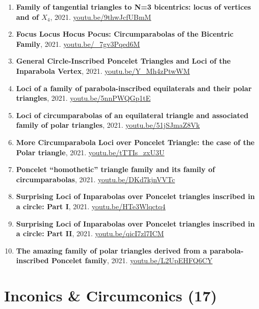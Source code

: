 \documentclass[12pt]{article}
\begin{document}
\begin{enumerate}[resume]
\item \textbf{Family of tangential triangles to N=3 bicentrics: locus of vertices and of $X_{4}$}, 2021. \href{https://youtu.be/9thwJcfUBmM}{\url{youtu.be/9thwJcfUBmM}}
\item \textbf{Focus Locus Hocus Pocus: Circumparabolas of the Bicentric Family}, 2021. \href{https://youtu.be/_7gv3Pqed6M}{\url{youtu.be/\_7gv3Pqed6M}}
\item \textbf{General Circle-Inscribed Poncelet Triangles and Loci of the Inparabola Vertex}, 2021. \href{https://youtu.be/Y_Mh4zPtwWM}{\url{youtu.be/Y\_Mh4zPtwWM}}
\item \textbf{Loci of a family of parabola-inscribed equilaterals and their polar triangles}, 2021. \href{https://youtu.be/5nnPWQGp1tE}{\url{youtu.be/5nnPWQGp1tE}}
\item \textbf{Loci of circumparabolas of an equilateral triangle and associated family of polar triangles}, 2021. \href{https://youtu.be/51jSJmaZ8Vk}{\url{youtu.be/51jSJmaZ8Vk}}
\item \textbf{More Circumparabola Loci over Poncelet Triangle: the case of the Polar triangle}, 2021. \href{https://youtu.be/tTTIs_zxU3U}{\url{youtu.be/tTTIs\_zxU3U}}
\item \textbf{Poncelet ``homothetic'' triangle family and its family of circumparabolas}, 2021. \href{https://youtu.be/DKd7kjnVVTc}{\url{youtu.be/DKd7kjnVVTc}}
\item \textbf{Surprising Loci of Inparabolas over Poncelet triangles inscribed in a circle: Part I}, 2021. \href{https://youtu.be/HTe3Wlqctq4}{\url{youtu.be/HTe3Wlqctq4}}
\item \textbf{Surprising Loci of Inparabolas over Poncelet triangles inscribed in a circle: Part II}, 2021. \href{https://youtu.be/qicI7zl7ICM}{\url{youtu.be/qicI7zl7ICM}}
\item \textbf{The amazing family of polar triangles derived from a parabola-inscribed Poncelet family}, 2021. \href{https://youtu.be/L2UpEHFQ6CY}{\url{youtu.be/L2UpEHFQ6CY}}
\end{enumerate}

\section{Inconics \& Circumconics (17)}
\end{document}
